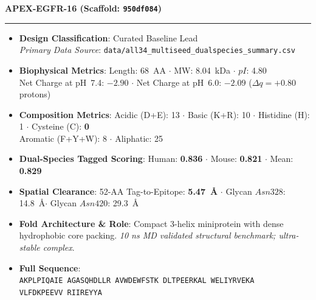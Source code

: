 \documentclass[11pt]{article}
\begin{document}
\noindent\textbf{\color{navyblue}\large APEX-EGFR-16  \quad (Scaffold: \texttt{950df084})} \\
\vspace{-0.4em}
\rule{\textwidth}{0.6pt}
\vspace{-0.2em}
\begin{itemize}
  \setlength{\itemsep}{2pt}
  \setlength{\parskip}{0pt}
  \item \textbf{Design Classification}: Curated Baseline Lead \\
    \textit{Primary Data Source}: \texttt{\small data/all34\_multiseed\_dualspecies\_summary.csv}
  \item \textbf{Biophysical Metrics}: Length: 68~AA $\cdot$ MW: 8.04~kDa $\cdot$ $pI$: 4.80 \\
    Net Charge at pH~7.4: $-2.90$ $\cdot$ Net Charge at pH~6.0: $-2.09$ ($\Delta q = +0.80$ protons)
  \item \textbf{Composition Metrics}: Acidic (D+E): 13 $\cdot$ Basic (K+R): 10 $\cdot$ Histidine (H): 1 $\cdot$ Cysteine (C): \textbf{0} \\
    Aromatic (F+Y+W): 8 $\cdot$ Aliphatic: 25
  \item \textbf{Dual-Species Tagged Scoring}: Human: \textbf{0.836} $\cdot$ Mouse: \textbf{0.821} $\cdot$ Mean: \textbf{0.829}
  \item \textbf{Spatial Clearance}: 52-AA Tag-to-Epitope: \textbf{5.47~\AA} $\cdot$ Glycan $Asn328$: 14.8~\AA $\cdot$ Glycan $Asn420$: 29.3~\AA
  \item \textbf{Fold Architecture \& Role}: Compact 3-helix miniprotein with dense hydrophobic core packing. \textit{10 ns MD validated structural benchmark; ultra-stable complex}.
  \item \textbf{Full Sequence}: \\
    \texttt{\small AKPLPIQAIE AGASQHDLLR AVWDEWFSTK DLTPEERKAL WELIYRVEKA \\
    VLFDKPEEVV RIIREYYA}
\end{itemize}
\vspace{0.8em}
\end{document}
